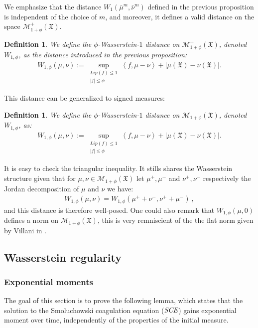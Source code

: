 \documentclass[11pt,a4paper]{article}
\newcommand{\MC}{\mathcal{M}}
\newcommand{\XF}{\mathfrak{X}}
\newcommand{\SCE}{\emph{SCE}}
\newcommand{\brac}[1]{\left\langle#1\right\rangle}
\newtheorem{definition}[theorem]{Definition}
\begin{document}
We emphasize that the distance $W_1(\bar{\mu}^m, \bar{\nu}^m)$ defined in the previous proposition is independent of the choice of $m$, and moreover, it defines a valid distance on the space $\MC^+_{1 + \phi}(\XF)$.

\begin{definition}\label{def:Wasserstein-general}
We define the \emph{$\phi$-Wasserstein-$1$ distance} on $\MC^+_{1 + \phi}(\XF)$, denoted $W_{1,\phi}$, as the distance introduced in the previous proposition:
\begin{align*}
    W_{1,\phi}(\mu, \nu) := \sup_{\substack{Lip(f) \leq 1\\ |f| \leq \phi}} \brac{f, \mu - \nu} + \left| \mu(\XF) - \nu(\XF) \right|.
\end{align*}
\end{definition}
This distance can be generalized to signed measures:
\begin{definition}\label{def:Wasserstein-general-signed}
    We define the \emph{$\phi$-Wasserstein-$1$ distance} on $\MC_{1 + \phi}(\XF)$, denoted $W_{1,\phi}$, as:
\begin{align*}
    W_{1,\phi}(\mu, \nu) := \sup_{\substack{Lip(f) \leq 1\\ |f| \leq \phi}} \brac{f, \mu - \nu} + \left| \mu(\XF) - \nu(\XF) \right|.
\end{align*}
\end{definition}
It is easy to check the triangular inequality. It stills shares the Wasserstein structure given that for $\mu,\nu \in \MC_{1 + \phi}(\XF)$ let $\mu^+,\mu^-$ and $\nu^+,\nu^-$ respectively the Jordan decomposition of $\mu$ and $\nu$ we have:
\begin{align*}
    W_{1,\phi}(\mu, \nu) = W_{1,\phi}(\mu^+ + \nu^-, \nu^+ + \mu^-)\ ,
\end{align*}
and this distance is therefore well-posed. One could also remark that $W_{1,\phi}(\mu,0)$ defines a norm on $\MC_{1 + \phi}(\XF)$, this is very remniscient of the the flat norm given by Villani in \cite{villani2008optimal}.
\subsection{Wasserstein regularity}
\subsubsection{Exponential moments}
The goal of this section is to prove the following lemma, which states that the solution to the Smoluchowski coagulation equation ($\SCE$) gains exponential moment over time, independently of the properties of the initial measure.
\end{document}
